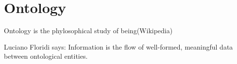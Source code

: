 \chapter{Ontology}
Ontology is the phylosophical study of being(Wikipedia)

Luciano Floridi  says:
Information is the flow of well-formed, meaningful data between ontological entities.